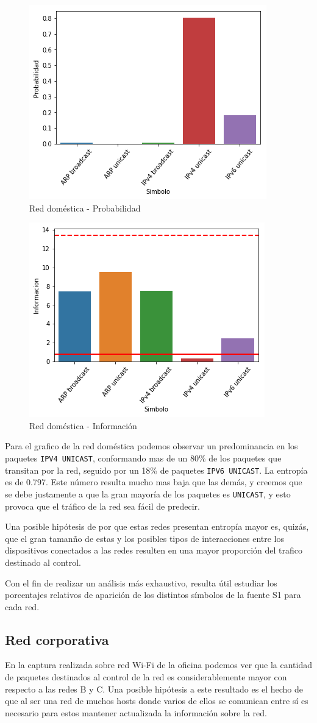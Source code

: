 \begin{figure}[ht]
	\centering
	\includegraphics[width=.5\linewidth]{imagenes/manu_casa_barras_prob}
	\caption{Red doméstica - Probabilidad}
\end{figure}

\begin{figure}[ht]
	\centering
	\includegraphics[width=.5\linewidth]{imagenes/manu_casa_barras_info}
	\caption{Red doméstica - Información}
\end{figure}

Para el grafico de la red doméstica podemos observar un predominancia en los paquetes \texttt{IPV4 UNICAST}, conformando mas de un 80\% de los paquetes que transitan por la red, seguido por un 18\% de paquetes \texttt{IPV6 UNICAST}. La entropía es de 0.797. Este número resulta mucho mas baja que las demás, y creemos que se debe justamente a que la gran mayoría de los paquetes es \texttt{UNICAST}, y esto provoca que el tráfico de la red sea fácil de predecir.

Una posible hipótesis de por que estas redes presentan entropía mayor es, quizás, que el gran tamanño de estas y los posibles tipos de interacciones entre los dispositivos conectados a las redes resulten en una mayor proporción del trafico destinado al control.



Con el fin de realizar un análisis más exhaustivo, resulta útil estudiar los porcentajes relativos de aparición de los distintos símbolos de la fuente S1 para cada red.

\subsection{Red corporativa}

En la captura realizada sobre red Wi-Fi de la oficina podemos ver que la cantidad de paquetes destinados al control de la red es considerablemente mayor con respecto a las redes B y C. Una posible hipótesis a este resultado es el hecho de que al ser una red de muchos hosts donde varios de ellos se comunican entre sí es necesario para estos mantener actualizada la información sobre la red.

